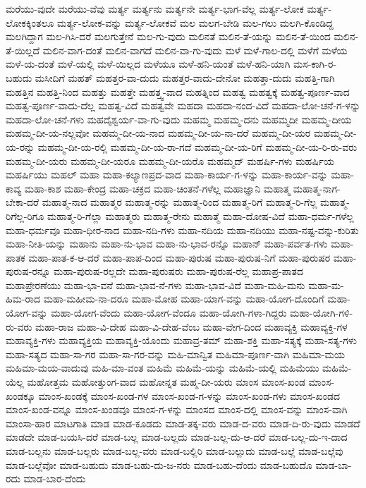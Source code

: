 {ಮರೆಯು-ವುದೇ
ಮರೆಯು-ವೆವು
ಮರ್ತ್ಯ
ಮರ್ತ್ಯನು
ಮರ್ತ್ಯನೇ
ಮರ್ತ್ಯ-ಭಾಗ-ವೆಲ್ಲ
ಮರ್ತ್ಯ-ಲೋಕ
ಮರ್ತ್ಯ-ಲೋಕಕ್ಕಿಂತಲೂ
ಮರ್ತ್ಯ-ಲೋಕ-ವನ್ನು
ಮರ್ತ್ಯ-ಲೋಕವೆ
ಮಲ
ಮಲಗ-ಬೇಡಿ
ಮಲ-ಗಲು
ಮಲಗಿ-ಕೊಂಡಿದ್ದ
ಮಲಗಿದ್ದಾಗ
ಮಲ-ಗಿಸಿ-ದರೆ
ಮಲಗುತ್ತೇನೆ
ಮಲ-ಗು-ವುದು
ಮಲಿನತೆ
ಮಲಿನ-ತೆ-ಯನ್ನು
ಮಲಿನ-ತೆ-ಯಿಂದ
ಮಲಿನ-ತೆ-ಯಿಲ್ಲದೆ
ಮಲಿನ-ವಾಗ-ದಂತೆ
ಮಲಿನ-ವಾಗದೆ
ಮಲಿನ-ವಾ-ಗು-ವುದು
ಮಳೆ
ಮಳೆ-ಗಾಲ-ದಲ್ಲಿ
ಮಳೆಗೆ
ಮಳೆಯ
ಮಳೆ-ಯ-ದಂತೆ
ಮಳೆ-ಯಲ್ಲಿ
ಮಳೆ-ಯಿಲ್ಲದ
ಮಳೆಯೂ
ಮಳೆ-ಹನಿ-ಯಂತೆ
ಮಳೆ-ಹನಿ-ಯಾಗಿ
ಮಸ-ಕಾಗಿ-ರ-ಬಹುದು
ಮಸೀದಿಗೆ
ಮಹತ್
ಮಹತ್ತರ-ವಾ-ದುದು
ಮಹತ್ತರ-ವಾದು-ದೇನೋ
ಮಹತ್ತಾ-ದುದು
ಮಹತ್ತಿ-ಗಾಗಿ
ಮಹತ್ತಿನ
ಮಹತ್ತಿ-ನಿಂದ
ಮಹತ್ತು
ಮಹತ್ತೇ
ಮಹತ್ತ್ವ-ವಾದ
ಮಹತ್ನಿಂದ
ಮಹತ್ವ
ಮಹತ್ವಕ್ಕೆ
ಮಹತ್ವ-ಪೂರ್ಣ-ವಾದ
ಮಹತ್ವ-ಪೂರ್ಣ-ವಾದು-ದೆಲ್ಲ
ಮಹತ್ವ-ವಿದೆ
ಮಹತ್ವವೇ
ಮಹದಾ
ಮಹದಾ-ನಂದ-ವಿದೆ
ಮಹದಾ-ಲೋ-ಚನೆ-ಗ-ಳನ್ನು
ಮಹದಾ-ಲೋ-ಚನೆ-ಗಳು
ಮಹದೈಶ್ವರ್ಯ-ವಾ-ಗು-ವುದು
ಮಹಮ್ಮ
ಮಹಮ್ಮ-ದನು
ಮಹಮ್ಮದೀ
ಮಹಮ್ಮ-ದೀಯ
ಮಹಮ್ಮ-ದೀ-ಯ-ನಲ್ಲವೋ
ಮಹಮ್ಮ-ದೀ-ಯ-ನಾದ
ಮಹಮ್ಮ-ದೀ-ಯ-ನಾ-ದರೆ
ಮಹಮ್ಮ-ದೀ-ಯರ
ಮಹಮ್ಮ-ದೀ-ಯ-ರನ್ನು
ಮಹಮ್ಮ-ದೀ-ಯ-ರಲ್ಲಿ
ಮಹಮ್ಮ-ದೀ-ಯ-ರಾ-ಗದೆ
ಮಹಮ್ಮ-ದೀ-ಯ-ರಿಗೆ
ಮಹಮ್ಮ-ದೀ-ಯ-ರಿ-ರು-ವರು
ಮಹಮ್ಮ-ದೀ-ಯರು
ಮಹಮ್ಮ-ದೀ-ಯರೂ
ಮಹಮ್ಮ-ದೀ-ಯರೊ
ಮಹಮ್ಮದ್
ಮಹರ್ಷಿ-ಗಳು
ಮಹರ್ಷಿಯ
ಮಹರ್ಷಿಯು
ಮಹಲ್
ಮಹಾ
ಮಹಾ-ಕಲ್ಯಾಣಪ್ರದ-ವಾದ
ಮಹಾ-ಕಾರ್ಯ-ಗ-ಳನ್ನು
ಮಹಾ-ಕಾರ್ಯ-ವನ್ನು
ಮಹಾ-ಕಾವ್ಯ
ಮಹಾ-ಕಾಶ
ಮಹಾ-ಕೇಂದ್ರ
ಮಹಾ-ಚಕ್ರದ
ಮಹಾ-ಚಿಂತನೆ-ಗಳೆಲ್ಲ
ಮಹಾಜ್ಞಾನಿ
ಮಹಾತ್ಮ
ಮಹಾತ್ಮ-ನಾಗ-ಬೇಕಾ-ದರೆ
ಮಹಾತ್ಮ-ನಾದ
ಮಹಾತ್ಮರ
ಮಹಾತ್ಮ-ರನ್ನು
ಮಹಾತ್ಮ-ರಿಂದ
ಮಹಾತ್ಮ-ರಿಗೆ
ಮಹಾತ್ಮ-ರಿ-ಗೆಲ್ಲ
ಮಹಾತ್ಮ-ರಿಗೆಲ್ಲ-ರಿಗೂ
ಮಹಾತ್ಮ-ರಿ-ಗೆಲ್ಲಾ
ಮಹಾತ್ಮರು
ಮಹಾತ್ಮ-ರೇನು
ಮಹಾತ್ಮೆ
ಮಹಾ-ದೋಷ-ವಿದೆ
ಮಹಾ-ಧರ್ಮ-ಗಳೆಲ್ಲ
ಮಹಾ-ಧರ್ಮವೂ
ಮಹಾ-ಧೀರ-ನಾದ
ಮಹಾ-ನದಿ-ಗಳು
ಮಹಾ-ನದಿಯ
ಮಹಾ-ನದಿಯು
ಮಹಾ-ನಷ್ಟ-ವನ್ನು-ಕುರಿತು
ಮಹಾ-ನೀತಿ-ಯನ್ನು
ಮಹಾನು
ಮಹಾ-ನು-ಭಾವ
ಮಹಾ-ನು-ಭಾವ-ರನ್ನೊ
ಮಹಾನ್
ಮಹಾ-ಪರ್ವತ-ಗಳು
ಮಹಾ-ಪಾತಕ
ಮಹಾ-ಪಾತ-ಕ-ಆ-ದರೆ
ಮಹಾ-ಪಾಪ-ದಿಂದ
ಮಹಾ-ಪುರುಷ
ಮಹಾ-ಪುರುಷ-ನಿಗೆ
ಮಹಾ-ಪುರುಷರ
ಮಹಾ-ಪುರುಷ-ರನ್ನೂ
ಮಹಾ-ಪುರುಷ-ರಲ್ಲದೇ
ಮಹಾ-ಪುರುಷರು
ಮಹಾ-ಪುರುಷ-ರೆಲ್ಲ
ಮಹಾಪ್ರ-ಪಾತದ
ಮಹಾಪ್ರೇರಣೆಯು
ಮಹಾ-ಭಾ-ವನೆ
ಮಹಾ-ಭಾವ-ನೆ-ಗಳು
ಮಹಾ-ಭಾವ-ವಿದೆ
ಮಹಾ-ಮಹಿ-ಮನು
ಮಹಾ-ಮ-ಹಿಮ-ರಾದ
ಮಹಾ-ಮಹೀಮ-ನಾ-ದರೂ
ಮಹಾ-ಮೋಹ
ಮಹಾ-ಯಾಗ-ವನ್ನು
ಮಹಾ-ಯೋಗ-ದೊಂದಿಗೆ
ಮಹಾ-ಯೋಗ-ವನ್ನು
ಮಹಾ-ಯೋಗ-ವೆಂದು
ಮಹಾ-ಯೋಗ-ವೆಂದೂ
ಮಹಾ-ಯೋಗಿ-ಗಳಾ-ಗಿದ್ದರು
ಮಹಾ-ಯೋಗಿ-ಗಳಿ-ರು-ವರು
ಮಹಾ-ರಾಜ
ಮಹಾ-ವಿ-ದೇಹ
ಮಹಾ-ವಿ-ದೇಹ-ವೆಂಬ
ಮಹಾ-ವೇಗ-ದಿಂದ
ಮಹಾವ್ಯಕ್ತಿ
ಮಹಾವ್ಯಕ್ತಿ-ಗಳ
ಮಹಾವ್ಯಕ್ತಿ-ಗಳು
ಮಹಾವ್ಯಕ್ತಿಯ
ಮಹಾವ್ಯಕ್ತಿ-ಯೊಂದು
ಮಹಾವ್ರ-ತಮ್
ಮಹಾ-ಶಕ್ತಿ
ಮಹಾ-ಸತ್ಯಕ್ಕೆ
ಮಹಾ-ಸತ್ಯ-ಗಳು
ಮಹಾ-ಸತ್ಯದ
ಮಹಾ-ಸಾ-ಗರ
ಮಹಾ-ಸಾ-ಗರ-ವನ್ನು
ಮಹಿ-ಮಾನ್ವಿತ
ಮಹಿಮಾ-ಪೂರ್ಣ-ವಾಗಿ
ಮಹಿಮಾ-ಮಯ
ಮಹಿಮಾ-ಮಯ-ವಾದುವು
ಮಹಿ-ಮಾ-ವಂತ
ಮಹಿಮೆ
ಮಹಿಮೆ-ಯನ್ನು
ಮಹಿಮೆ-ಯಲ್ಲಿ
ಮಹಿಮೆಯು
ಮಹಿಮೆ-ಯೆಲ್ಲ
ಮಹೋತ್ತಮ
ಮಹೋತ್ತುಂಗ-ವಾದ
ಮಹೋನ್ನತ
ಮಹ್ಮ-ದೀ-ಯರು
ಮಾಂಸ
ಮಾಂಸ-ಖಂಡ
ಮಾಂಸ-ಖಂಡಕ್ಕೂ
ಮಾಂಸ-ಖಂಡಕ್ಕೆ
ಮಾಂಸ-ಖಂಡ-ಗಳ
ಮಾಂಸ-ಖಂಡ-ಗ-ಳನ್ನು
ಮಾಂಸ-ಖಂಡ-ಗಳು
ಮಾಂಸ-ಖಂಡದ
ಮಾಂಸ-ಖಂಡ-ವನ್ನೂ
ಮಾಂಸ-ಖಂಡವೂ
ಮಾಂಸ-ಗ-ಳನ್ನು
ಮಾಂಸದ
ಮಾಂಸ-ದಲ್ಲಿ
ಮಾಂಸ-ವನ್ನು
ಮಾಂಸ-ವಾಗಿ
ಮಾಂಸಾ-ಹಾರ
ಮಾಟಗಾತಿ
ಮಾಡ
ಮಾಡ-ಕೂಡದು
ಮಾಡ-ತಕ್ಕ-ವರು
ಮಾಡ-ದ-ವರು
ಮಾಡ-ದಿ-ರು-ವುದು
ಮಾಡದೆ
ಮಾಡದೇ
ಮಾಡ-ಬಯಸಿ-ದರೆ
ಮಾಡ-ಬಲ್ಲ
ಮಾಡ-ಬಲ್ಲದು
ಮಾಡ-ಬಲ್ಲ-ದು-ಆ-ದರೆ
ಮಾಡ-ಬಲ್ಲ-ದು-ಇ-ದಾದ
ಮಾಡ-ಬಲ್ಲನು
ಮಾಡ-ಬಲ್ಲರು
ಮಾಡ-ಬಲ್ಲ-ವರು
ಮಾಡ-ಬಲ್ಲಿರಿ
ಮಾಡ-ಬಲ್ಲುದು
ಮಾಡ-ಬಲ್ಲೆ
ಮಾಡ-ಬಲ್ಲೆವು
ಮಾಡ-ಬಲ್ಲೆವೋ
ಮಾಡ-ಬಹುದು
ಮಾಡ-ಬಹು-ದು-ಜ-ನರು
ಮಾಡ-ಬಹು-ದೆಂದು
ಮಾಡ-ಬಹುದೊ
ಮಾಡ-ಬಾ-ರದು
ಮಾಡ-ಬಾರ-ದೆಂದು
}
